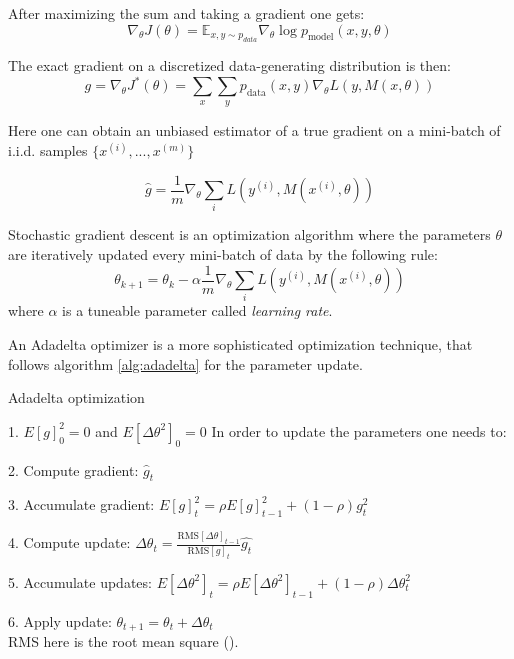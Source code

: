 After maximizing the sum and taking a gradient one gets:
\begin{equation}
	\nabla_{\theta} J(\theta) = \mathbb{E}_{x, y \sim p_{data}} \nabla_{\theta} \log{p_{\text{model}}(x, y, \theta)}
\end{equation}

The exact gradient on a discretized data-generating distribution is then:
\begin{equation}
	g = \nabla_{\theta} J^*(\theta) = \sum_{x} \sum_{y}{p_{\text{data}}(x, y) \nabla_{\theta} L(y, M(x, \theta))}
\end{equation}

Here one can obtain an unbiased estimator of a true gradient on a mini-batch of i.i.d. samples $\{x^{(i)}, ..., x^{(m)}\}$	

\begin{equation}
	\hat{g} = \frac{1}{m} \nabla_\theta \sum_{i} L(y^{(i)}, M(x^{(i)}, \theta))
\end{equation}

\begin{definition}
	Stochastic gradient descent is an optimization algorithm where the parameters $\theta$ are iteratively updated every mini-batch of data by the following rule:
	\begin{equation}
		\theta_{k+1} = \theta_k - \alpha \frac{1}{m} \nabla_\theta \sum_{i} L(y^{(i)}, M(x^{(i)}, \theta))
	\end{equation}
	where $\alpha$ is a tuneable parameter called \textit {learning rate}.
\end{definition}

\begin{definition}
	An Adadelta optimizer is a more sophisticated optimization technique, that follows algorithm \ref{alg:adadelta} for the parameter update.
	\begin{algorithm}
		\caption{Adadelta optimization}\label{alg:adadelta}
		\item 1. $E[g]^2_0 = 0$ and $E[\Delta \theta^2]_0 = 0$
		In order to update the parameters one needs to:
		\item 2. Compute gradient: $\hat{g}_t$
		\item 3. Accumulate gradient: $E[g]^2_t = \rho E[g]^2_{t - 1} + (1 - \rho)g_t^2$
		\item 4. Compute update: $\Delta \theta_t = \frac{\text{RMS}[\Delta \theta]_{t-1}}{\text{RMS}[g]_t} \hat{g_t}$
		\item 5. Accumulate updates: $E[\Delta \theta^2]_t = \rho E[\Delta \theta^2]_{t-1} + (1 - \rho) \Delta \theta^2_t$
		\item 6. Apply update: $\theta_{t+1} = \theta_t + \Delta \theta_t$ \\
		RMS here is the root mean square (\cite{Zeiler_2012}).
	\end{algorithm}
\end{definition}

